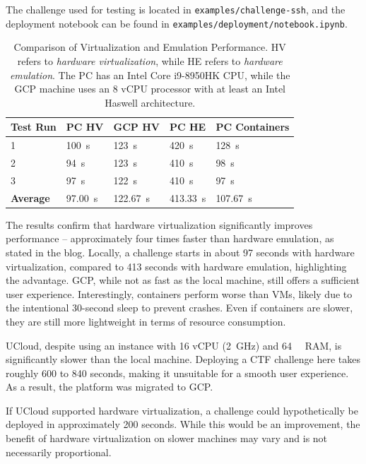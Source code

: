 The challenge used for testing is located in \texttt{examples/challenge-ssh}, and the deployment notebook can be found in \texttt{examples/deployment/notebook.ipynb}.

\begin{table}[h]
\centering
\begin{tabular}{|l|l|l|l|l|}
\hline
\textbf{Test Run} & \textbf{PC HV} & \textbf{GCP HV} & \textbf{PC HE} & \textbf{PC Containers} \\ \hline
1 & \SI{100}{\second} & \SI{123}{\second} & \SI{420}{\second} & \SI{128}{\second} \\ \hline
2 & \SI{94}{\second}  & \SI{123}{\second} & \SI{410}{\second} & \SI{98}{\second}  \\ \hline
3 & \SI{97}{\second}  & \SI{122}{\second} & \SI{410}{\second} & \SI{97}{\second}  \\ \hline \hline
\textbf{Average} & \SI{97.00}{\second} & \SI{122.67}{\second} & \SI{413.33}{\second} & \SI{107.67}{\second} \\ \hline
\end{tabular}
\caption{Comparison of Virtualization and Emulation Performance. HV refers to \textit{hardware virtualization}, while HE refers to \textit{hardware emulation}. The PC has an Intel Core i9-8950HK CPU, while the GCP machine uses an 8 vCPU processor with at least an Intel Haswell architecture.}
\label{table:performance}
\end{table}

The results confirm that hardware virtualization significantly improves performance -- approximately four times faster than hardware emulation, as stated in the blog. Locally, a challenge starts in about 97 seconds with hardware virtualization, compared to 413 seconds with hardware emulation, highlighting the advantage. GCP, while not as fast as the local machine, still offers a sufficient user experience. Interestingly, containers perform worse than VMs, likely due to the intentional 30-second sleep to prevent crashes. Even if containers are slower, they are still more lightweight in terms of resource consumption.

UCloud, despite using an instance with 16 vCPU (\SI{2}{\giga\hertz}) and \SI{64}{\giga\byte} RAM, is significantly slower than the local machine. Deploying a CTF challenge here takes roughly 600 to 840 seconds, making it unsuitable for a smooth user experience. As a result, the platform was migrated to GCP.

If UCloud supported hardware virtualization, a challenge could hypothetically be deployed in approximately 200 seconds. While this would be an improvement, the benefit of hardware virtualization on slower machines may vary and is not necessarily proportional.

